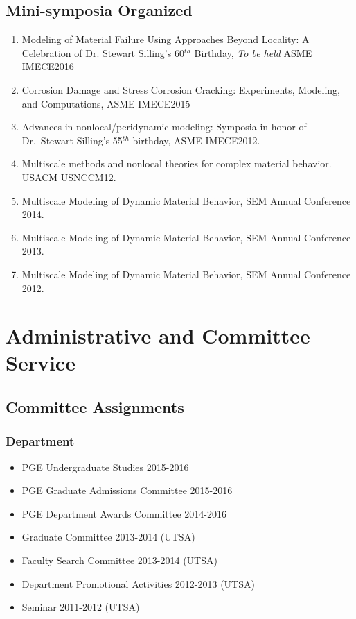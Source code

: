 \subsection*{Mini-symposia Organized}

\begin{enumerate}
    \item Modeling of Material Failure Using Approaches Beyond Locality: A Celebration of Dr. Stewart Silling's 60$^{th}$ Birthday, \emph{To be held} ASME IMECE2016
    \item Corrosion Damage and Stress Corrosion Cracking: Experiments, Modeling, and Computations, ASME IMECE2015
    \item Advances in nonlocal/peridynamic modeling: Symposia in honor of Dr.~Stewart Silling's 55$^{th}$ birthday, ASME IMECE2012.
    \item Multiscale methods and nonlocal theories for complex material behavior. USACM USNCCM12.
    \item Multiscale Modeling of Dynamic Material Behavior, SEM Annual Conference 2014.
    \item Multiscale Modeling of Dynamic Material Behavior, SEM Annual Conference 2013.
    \item Multiscale Modeling of Dynamic Material Behavior, SEM Annual Conference 2012.
\end{enumerate}

\section*{Administrative and Committee Service}
\subsection*{Committee Assignments}
\subsubsection*{Department}
\begin{itemize}
    \item PGE Undergraduate Studies 2015-2016
    \item PGE Graduate Admissions Committee 2015-2016
    \item PGE Department Awards Committee 2014-2016
    \item Graduate Committee 2013-2014 (UTSA)
    \item Faculty Search Committee 2013-2014 (UTSA)
    \item Department Promotional Activities 2012-2013 (UTSA)
    \item Seminar 2011-2012 (UTSA)
\end{itemize}

